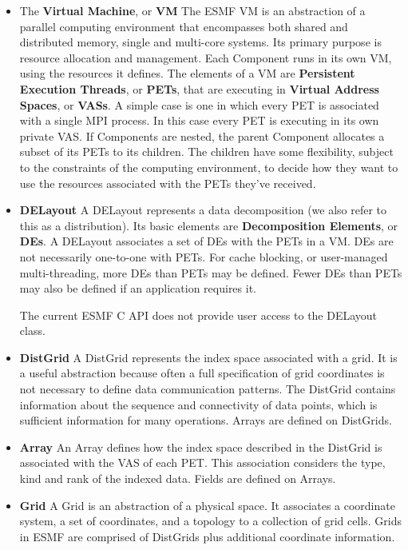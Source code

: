 \begin{itemize}

\item The {\bf Virtual Machine}, or {\bf VM} The ESMF VM is an 
abstraction of a parallel computing environment that encompasses 
both shared and distributed memory, single and multi-core systems.
Its primary purpose is resource allocation and management. Each Component
runs in its own VM, using the resources it defines. The elements of a VM
are {\bf Persistent Execution Threads}, or {\bf PETs}, that are
executing in {\bf Virtual Address Spaces}, or {\bf VASs}. A simple
case is one in which every PET is associated with a single MPI process.
In this case every PET is executing in its own private VAS. If Components
are nested, the parent Component allocates a subset of its PETs to its
children. The children have some flexibility, subject to the constraints of
the computing environment, to decide how they want to use the
resources associated with the PETs they've received.

\item {\bf DELayout}  A DELayout represents a data decomposition
(we also refer to this as a distribution).  Its
basic elements are {\bf Decomposition Elements}, or {\bf DEs}.  
A DELayout associates a set of DEs with the PETs in a VM.  DEs are not
necessarily one-to-one with PETs.  For cache blocking,
or user-managed multi-threading, more DEs than PETs may be defined.
Fewer DEs than PETs may also be defined if an application requires it.

The current ESMF C API does not provide user access to the DELayout class.

\item {\bf DistGrid}  A DistGrid represents the index space
associated with a grid.  It is a useful abstraction because
often a full specification of grid coordinates is not necessary
to define data communication patterns.  The DistGrid contains
information about the sequence and connectivity of data points,
which is sufficient information for many operations.  Arrays
are defined on DistGrids.

\item {\bf Array} An Array defines how the index space described
in the DistGrid is associated with the VAS of each PET. This association
considers the type, kind and rank of the indexed data. Fields are
defined on Arrays.

\item {\bf Grid}  A Grid is an abstraction of a physical space.  
It associates a coordinate system, a set of coordinates, and 
a topology to a collection of grid cells.  Grids in ESMF are
comprised of DistGrids plus additional coordinate information. 


\end{itemize}
